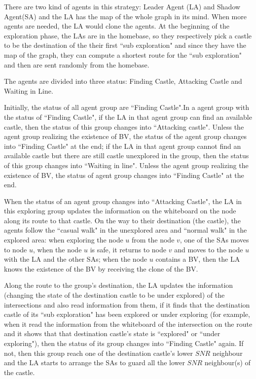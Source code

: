 There are two kind of agents in this strategy: Leader Agent (LA) and Shadow Agent(SA) and the LA has the map of the whole graph in its mind. When more agents are needed, the LA would clone the agents. At the beginning of the exploration phase, the LAs are in the homebase, so they respectively pick a castle to be the destination of the their first ``sub exploration" and since they have the map of the graph, they can compute a shortest route for the ``sub exploration" and then are sent randomly from the homebase. 

The agents are divided into three status: Finding Castle, Attacking Castle and Waiting in Line. 

Initially, the status of all agent group are ``Finding Castle".In a agent group with the status of ``Finding Castle", if the LA in that agent group can find an available castle, then the status of this group changes into ``Attacking castle". Unless the agent group realizing the existence of BV, the status of the agent group changes into ``Finding Castle" at the end; if the LA in that agent group cannot find an available castle but there are still castle unexplored in the group, then the status of this group changes into ``Waiting in line". Unless the agent group realizing the existence of BV, the status of agent group changes into ``Finding Castle" at the end. 

When the status of an agent group changes into ``Attacking Castle", the LA in this exploring group updates the information on the whiteboard on the node along its route to that castle. On the way to their destination (the castle), the agents follow the ``casual walk" in the unexplored area and ``normal walk" in the explored area: when exploring the node $u$ from the node $v$, one of the SAs moves to node $u$, when the node $u$ is safe, it returns to node $v$ and moves to the node $u$ with the LA and the other SAs; when the node $u$ contains a BV, then the LA knows the existence of the BV by receiving the clone of the BV.   

Along the route to the group's destination, the LA updates the information (changing the state of the destination castle to be under explored) of the intersections and also read information from them, if it finds that the destination castle of its ``sub exploration" has been explored or under exploring (for example, when it read the information from the whiteboard of the intersection on the route and it shows that that destination castle's state is ``explored" or ``under exploring"), then the status of its group changes into ``Finding Castle" again. If not, then this group reach one of the destination castle's lower $SNR$ neighbour and the LA starts to arrange the SAs to guard all the lower $SNR$ neighbour(s) of the castle. 

